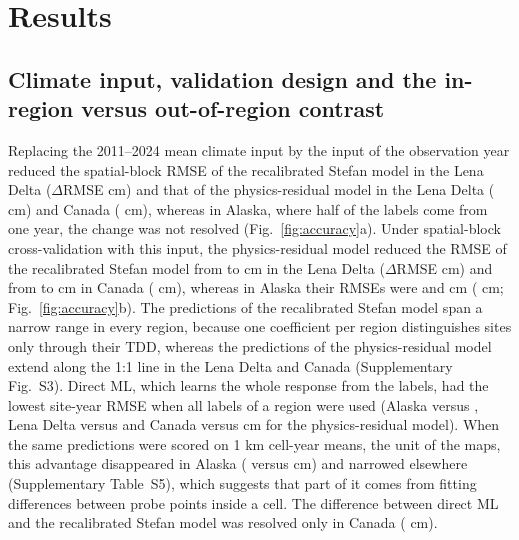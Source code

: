 \section{Results}\label{sec:results}

\subsection{Climate input, validation design and the in-region versus out-of-region contrast}
Replacing the 2011--2024 mean climate input by the input of the observation year reduced the spatial-block RMSE of the recalibrated Stefan model in the Lena Delta ($\Delta$RMSE \ndforcLePo{} cm) and that of the physics-residual model in the Lena Delta (\ndforcLeRo{} cm) and Canada (\ndforcCaRo{} cm), whereas in Alaska, where half of the labels come from one year, the change was not resolved (Fig.~\ref{fig:accuracy}a). Under spatial-block cross-validation with this input, the physics-residual model reduced the RMSE of the recalibrated Stefan model from \nrmseLeblkPo{} to \nrmseLeblkRo{} cm in the Lena Delta ($\Delta$RMSE \ndrefLeblkRo{} cm) and from \nrmseCablkPo{} to \nrmseCablkRo{} cm in Canada (\ndrefCablkRo{} cm), whereas in Alaska their RMSEs were \nrmseAkblkPo{} and \nrmseAkblkRo{} cm (\ndrefAkblkRo{} cm; Fig.~\ref{fig:accuracy}b). The predictions of the recalibrated Stefan model span a narrow range in every region, because one coefficient per region distinguishes sites only through their TDD, whereas the predictions of the physics-residual model extend along the 1:1 line in the Lena Delta and Canada (Supplementary Fig.~S3). Direct ML, which learns the whole response from the labels, had the lowest site-year RMSE when all labels of a region were used (Alaska \nrmseAkblkDz{} versus \nrmseAkblkRo, Lena Delta \nrmseLeblkDz{} versus \nrmseLeblkRo{} and Canada \nrmseCablkDz{} versus \nrmseCablkRo{} cm for the physics-residual model). When the same predictions were scored on 1 km cell-year means, the unit of the maps, this advantage disappeared in Alaska (\ncyAkblkDz{} versus \ncyAkblkRo{} cm) and narrowed elsewhere (Supplementary Table~S5), which suggests that part of it comes from fitting differences between probe points inside a cell. The difference between direct ML and the recalibrated Stefan model was resolved only in Canada (\ndrefCablkDz{} cm).

